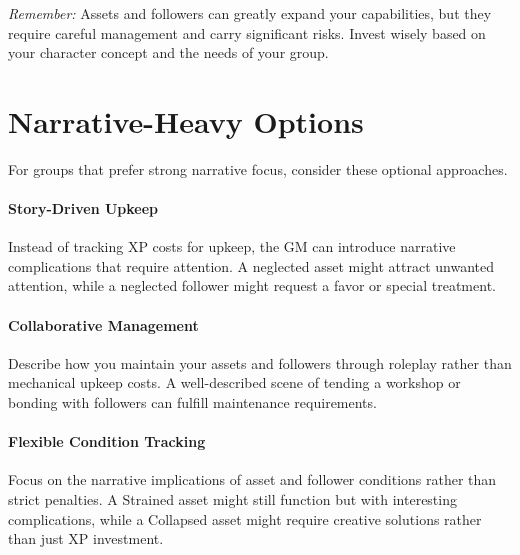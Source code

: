 \emph{Remember:} Assets and followers can greatly expand your capabilities, but they require careful management and carry significant risks. Invest wisely based on your character concept and the needs of your group.

\section{Narrative-Heavy Options}
\label{sec:narrative-assets}

For groups that prefer strong narrative focus, consider these optional approaches.

\paragraph{Story-Driven Upkeep}
Instead of tracking XP costs for upkeep, the GM can introduce narrative complications that require attention. A neglected asset might attract unwanted attention, while a neglected follower might request a favor or special treatment.

\paragraph{Collaborative Management}
Describe how you maintain your assets and followers through roleplay rather than mechanical upkeep costs. A well-described scene of tending a workshop or bonding with followers can fulfill maintenance requirements.

\paragraph{Flexible Condition Tracking}
Focus on the narrative implications of asset and follower conditions rather than strict penalties. A Strained asset might still function but with interesting complications, while a Collapsed asset might require creative solutions rather than just XP investment.

